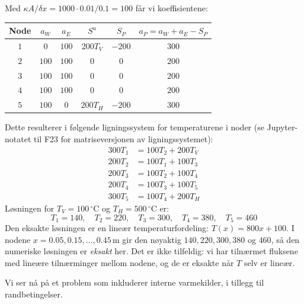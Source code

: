 Med $\kappa A/\delta x = 1000\cdot 0.01/0.1 = 100$ får vi koeffisientene:
\begin{center}
\begin{tabular}{|c|c|c|c|c|c|}
\hline
Node & $a_W$ & $a_E$ & $S^u$ & $S_P$ & $a_P=a_W+a_E-S_P$ \\
\hline
$1$ & $0$ & $100$ & $200T_V$ & $-200$ & $300$ \\
$2$ & $100$ & $100$ &  $0$ &  $0$ & $200$ \\
$3$ & $100$ & $100$ &  $0$ &  $0$ & $200$ \\
$4$ & $100$ & $100$ &  $0$ &  $0$ & $200$ \\
$5$ & $100$ & $0$ & $200T_H$ & $-200$ & $300$ \\
\hline
\end{tabular}
\end{center}
Dette resulterer i følgende ligningssystem for temperaturene i noder (se Jupyter-notatet til F23 for matriseversjonen av ligningssystemet):
\[
\begin{aligned}
300 T_1 &= 100 T_2 + 200 T_V \\
200 T_2 &= 100 T_1 + 100 T_3 \\
200 T_3 &= 100 T_2 + 100 T_4 \\
200 T_4 &= 100 T_3 + 100 T_5 \\
300 T_5 &= 100 T_4 + 200 T_H
\end{aligned}
\]
Løsningen for $T_V = 100\,^\circ$C og $T_H = 500\,^\circ$C er:
\[
T_1 = 140, \quad T_2 = 220, \quad T_3 = 300, \quad T_4 = 380, \quad T_5 = 460
\]
Den eksakte løsningen er en lineær temperaturfordeling: $T(x) = 800x + 100$. I nodene $x=0.05, 0.15, \ldots, 0.45\,\text{m}$ gir den nøyaktig $140, 220, 300, 380$ og $460$, så den numeriske løsningen er \emph{eksakt} her. Det er ikke tilfeldig: vi har tilnærmet fluksene med lineære tilnærminger mellom nodene, og de er eksakte når $T$ selv er lineær. 


Vi ser nå på et problem som inkluderer interne varmekilder, i tillegg til randbetingelser.

